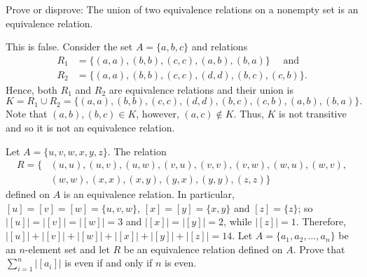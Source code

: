 \documentclass[12pt]{article}
\newenvironment{problem}[2][Problem]{\begin{trivlist}
		\item[\hskip \labelsep {\bfseries #1}\hskip \labelsep {\bfseries #2.}]}{\end{trivlist}}
\newenvironment{solution}[2][Solution]{\begin{trivlist}
		\item[\hskip \labelsep {\bfseries #1}\hskip \labelsep {\bfseries #2.}]}{\end{trivlist}}
\begin{document}
 	\begin{problem}{42}
 		Prove or disprove: The union of two equivalence relations on a nonempty set is an equivalence relation.
 		\begin{solution}{42}
 			This is false. Consider the set $A=\{a,b,c\}$ and relations 
 			\begin{align*}
 			R_{1} &= \{(a,a),(b,b),(c,c),(a,b),(b,a)\}\quad \text{ and}\\ R_{2} &= \{(a,a),(b,b),(c,c),(d,d),(b,c),(c,b)\}.
 			\end{align*}
 			Hence, both $R_{1}$ and $R_{2}$ are equivalence relations and their union is 
 			\begin{equation*}
 			K=R_{1}\cup R_{2} = \{(a,a),(b,b),(c,c),(d,d),(b,c),(c,b),(a,b),(b,a)\}.
 			\end{equation*}
 			Note that $(a,b),(b,c)\in K$, however, $(a,c)\not\in K$. Thus, $K$ is not transitive and so it is not an equivalence relation.
 		\end{solution}
 	\end{problem}
 
 	\begin{problem}{43}
 		Let $A=\{u,v,w,x,y,z\}$. The relation
 		\begin{align*}
 			R=\{&(u,u),(u,v),(u,w),(v,u),(v,v),(v,w),(w,u),(w,v),\\
 			&(w,w),(x,x),(x,y),(y,x),(y,y),(z,z)\}
 		\end{align*}
 		defined on $A$ is an equivalence relation. In particular, $[u]=[v]=[w]=\{u,v,w\}$, $[x]=[y]=\{x,y\}$ and $[z]=\{z\}$; so $|[u]|=|[v]|=|[w]|=3$ and $|[x]|=|[y]|=2$, while $|[z]|=1$. Therefore, $|[u]|+|[v]|+|[w]|+|[x]|+|[y]|+|[z]|=14$. Let $A=\{a_{1},a_{2},\ldots,a_{n}\}$ be an $n$-element set and let $R$ be an equivalence relation defined on $A$. Prove that $\sum_{i=1}^{n}|[a_{i}]|$ is even if and only if $n$ is even.
 	\end{problem}
\end{document}
